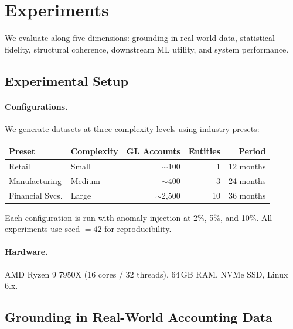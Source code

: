 \section{Experiments}
\label{sec:experiments}

We evaluate \system{} along five dimensions: grounding in real-world
data, statistical fidelity, structural coherence, downstream ML utility,
and system performance.

\subsection{Experimental Setup}
\label{sec:exp_setup}

\paragraph{Configurations.}
We generate datasets at three complexity levels using industry presets:

\begin{center}
\small
\begin{tabular}{llrrr}
\toprule
\textbf{Preset} & \textbf{Complexity} & \textbf{GL Accounts}
  & \textbf{Entities} & \textbf{Period} \\
\midrule
Retail          & Small  & $\sim$100  & 1  & 12 months \\
Manufacturing   & Medium & $\sim$400  & 3  & 24 months \\
Financial Svcs. & Large  & $\sim$2{,}500 & 10 & 36 months \\
\bottomrule
\end{tabular}
\end{center}

Each configuration is run with anomaly injection at 2\%, 5\%, and 10\%.
All experiments use seed $= 42$ for reproducibility.

\paragraph{Hardware.}
AMD Ryzen 9 7950X (16 cores / 32 threads), 64\,GB RAM, NVMe SSD,
Linux 6.x.

\subsection{Grounding in Real-World Accounting Data}
\label{sec:exp_realworld}

